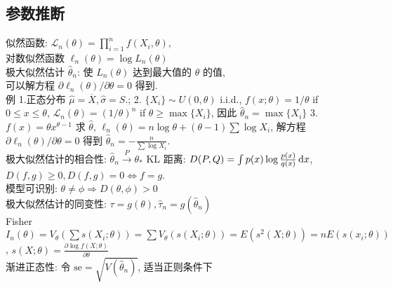 \documentclass[a4paper, landscape,10pt]{article}
\begin{document}
\begin{multicols}{4}
\section{参数推断}
似然函数: $\mathcal{L}_n(\theta) = \prod_{i = 1}^n f(X_i, \theta)$,\\
对数似然函数 $\ell_n(\theta) = \log L_n(\theta)$\\
极大似然估计 $\hat \theta_n$: 使 $L_n(\theta)$ 达到最大值的 $\theta$ 的值,\\
可以解方程 $\partial \ell_n(\theta) / \partial \theta = 0$ 得到. \\
例 1.正态分布 $\hat \mu = \overline X, \hat \sigma = S.$;
2. $\{X_i\} \sim U(0, \theta)$ i.i.d.,
$f(x; \theta) = 1/\theta$ if $0\leq x\leq \theta$,
$\mathcal{L}_n(\theta) = (1/\theta)^n$ if $\theta \geq \max \{X_i\}$,
因此 $\hat \theta_n = \max \{X_i\}$
3. $f(x) = \theta x ^ {\theta - 1}$ 求 $\hat \theta$, $\ell_n(\theta) = n \log \theta + (\theta - 1) \sum \log X_i$, 
解方程 $\partial \ell_n(\theta) / \partial \theta = 0$ 得到
$\hat \theta_n = - \frac{n}{\sum \log X_i}$.\\
极大似然估计的相合性: $\hat \theta_n \xrightarrow{P} \theta_*$
KL 距离: $D(P, Q) = \int p(x) \log \frac{p(x)}{q(x)} \,\mathrm{d} x$, $D(f, g)\geq 0, D(f, g) = 0 \Leftrightarrow f = g$.\\
模型可识别: $\theta \neq \phi \Rightarrow D(\theta, \phi) > 0$\\
极大似然估计的同变性: $\tau = g(\theta), \hat \tau_n = g(\hat \theta_n)$\\
Fisher $I_n(\theta) = V_\theta\left( \sum s(X_i; \theta) \right) = \sum V_\theta(s(X_i; \theta)) = E(s^2(X; \theta)) = n E(s(x_i; \theta))$, $s(X; \theta) = \frac {\partial \log f(X; \theta)} {\partial \theta}$\\
渐进正态性: 令 $\mathrm{se} = \sqrt{V(\hat \theta_n)}$, 适当正则条件下 \\


\end{multicols}
\end{document}
